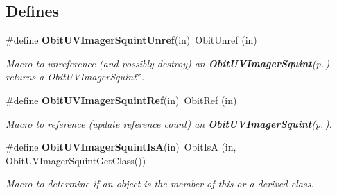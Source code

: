 \subsection*{Defines}
\begin{CompactItemize}
\item 
\#define {\bf Obit\-UVImager\-Squint\-Unref}(in)\ Obit\-Unref (in)
\begin{CompactList}\small\item\em Macro to unreference (and possibly destroy) an {\bf Obit\-UVImager\-Squint}{\rm (p.\,\pageref{structObitUVImagerSquint})} returns a Obit\-UVImager\-Squint$\ast$. \item\end{CompactList}\item 
\#define {\bf Obit\-UVImager\-Squint\-Ref}(in)\ Obit\-Ref (in)
\begin{CompactList}\small\item\em Macro to reference (update reference count) an {\bf Obit\-UVImager\-Squint}{\rm (p.\,\pageref{structObitUVImagerSquint})}. \item\end{CompactList}\item 
\#define {\bf Obit\-UVImager\-Squint\-Is\-A}(in)\ Obit\-Is\-A (in, Obit\-UVImager\-Squint\-Get\-Class())
\begin{CompactList}\small\item\em Macro to determine if an object is the member of this or a derived class. \item\end{CompactList}\end{CompactItemize}
